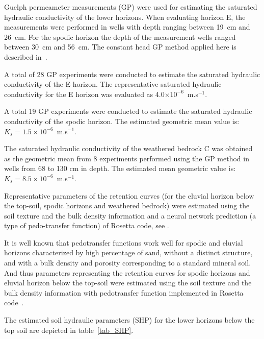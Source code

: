 \documentclass[review]{myarticle}
\begin{document}
Guelph permeameter measurements (GP) were used for estimating the saturated hydraulic conductivity of the lower horizons. When evaluating horizon E, the measurements were performed in wells with depth ranging between 19~cm  and 26~cm. For the spodic horizon the depth of the measurement wells ranged between 30~cm  and 56~cm. The constant head GP method applied here is described in~\citep{Jacka1}.

A total of 28 GP experiments were conducted to estimate the saturated hydraulic conductivity of the E horizon. 
 The representative saturated hydraulic conductivity for the E horizon was evaluated as 4.0$\times 10^{-6}$~m.s$^{-1}$.


A total 19 GP experiments were conducted to estimate the saturated hydraulic conductivity of the spodic horizon. The estimated geometric mean value is: $K_s =  1.5\times 10^{-6}$~m.s$^{-1}$.

The saturated hydraulic conductivity of the weathered
bedrock C was obtained as the geometric mean  from 8 experiments performed using the GP method  in wells from 68 to 130 cm in depth. The estimated mean geometric value is: $K_s =  8.5\times 10^{-6}$~m.s$^{-1}$.

Representative parameters of the retention curves (for the eluvial horizon below the top-soil, spodic horizons and weathered bedrock) were estimated using the soil texture and the bulk density information and a neural network prediction (a type of pedo-transfer function) of Rosetta code, see \citep{Schaap}. 

It is well known that pedotransfer functions work well for spodic and eluvial horizons characterized by high percentage of sand, without a distinct structure, and with a bulk density and porosity corresponding to a standard mineral soil. And thus parameters representing the retention curves for spodic horizons and eluvial horizon below the top-soil were estimated using the soil texture and the bulk density information with pedotransfer function implemented in Rosetta code~\citep{Schaap}.

The estimated soil hydraulic parameters (SHP) for the lower horizons below the top soil are depicted in table~\ref{tab_SHP}.
\end{document}
